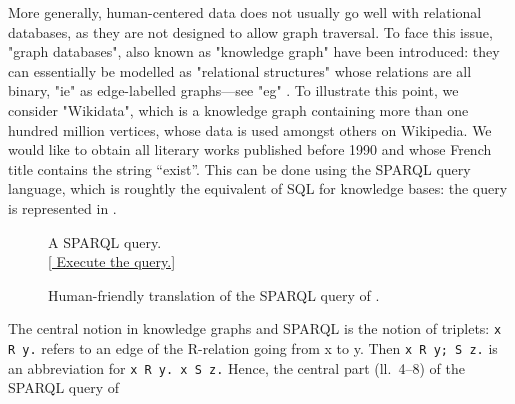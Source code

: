 More generally, human-centered data does not usually go well with
relational databases, as they are not designed to allow graph traversal.
To face this issue, "graph databases", also known as "knowledge graph" have
been introduced: they can essentially be modelled
as "relational structures" whose relations are all binary, "ie"
as edge-labelled graphs---see "eg" .
To illustrate this point, we consider
"Wikidata", which is a knowledge graph containing more than one hundred million
vertices, whose data is used amongst others on Wikipedia. 
We would like to obtain all literary works published before 1990 and whose
French title contains the string ``exist''.
This can be done using the SPARQL query language, which is roughtly the equivalent
of SQL for knowledge bases: the query is represented in .
\begin{figure}

	\caption{
		\label{fig:sparql}
		A SPARQL query.\\
	\href{https://query.wikidata.org/\#SELECT\%20DISTINCT\%20\%3Fwork\%20\%3FworkLabel\%20\%3FauthorLabel\%0AWHERE\%0A\%7B\%0A\%20\%20\%3Fwork\%09wdt\%3AP31\%2Fwdt\%3AP279\%2a\%20wd\%3AQ7725634\%3B\%0A\%20\%20\%20\%20\%20\%20\%20\%20rdfs\%3Alabel\%20\%3FworkLabel\%3B\%0A\%20\%20\%09\%09wdt\%3AP577\%20\%3Fdate\%3B\%0A\%20\%20\%20\%20\%20\%20\%20\%20wdt\%3AP50\%20\%3Fauthor.\%0A\%20\%20\%3Fauthor\%20rdfs\%3Alabel\%20\%3FauthorLabel.\%0A\%20\%20FILTER\%28LANG\%28\%3FworkLabel\%29\%20\%3D\%20\%22fr\%22\%20\%26\%26\%20LANG\%28\%3FauthorLabel\%29\%20\%3D\%20\%22fr\%22\%29.\%0A\%20\%20FILTER\%28CONTAINS\%28\%3FworkLabel\%2C\%20\%22exist\%22\%29\%29.\%0A\%20\%20FILTER\%28YEAR\%28\%3Fdate\%29\%20\%3C\%3D\%201990\%29.\%0A\%7D\%0ALIMIT\%207}{[\raisebox{-.4ex}{\HandRight} Execute the query.]}
	}
\end{figure}
\begin{figure}
	
	\caption{
		\label{fig:sparql-explained}
		Human-friendly translation of the SPARQL query of .
	}
\end{figure}
The central notion in knowledge graphs and SPARQL is the notion of triplets:
\lstinline[language=SQL]{x R y.} refers to an edge of the \textsf{R}-relation
going from \textsf{x} to \textsf{y}.
Then \lstinline[language=SQL]{x R y; S z.} is an abbreviation for
\lstinline[language=SQL]{x R y. x S z.}
Hence, the central part (ll.~4--8) of the SPARQL query of 
